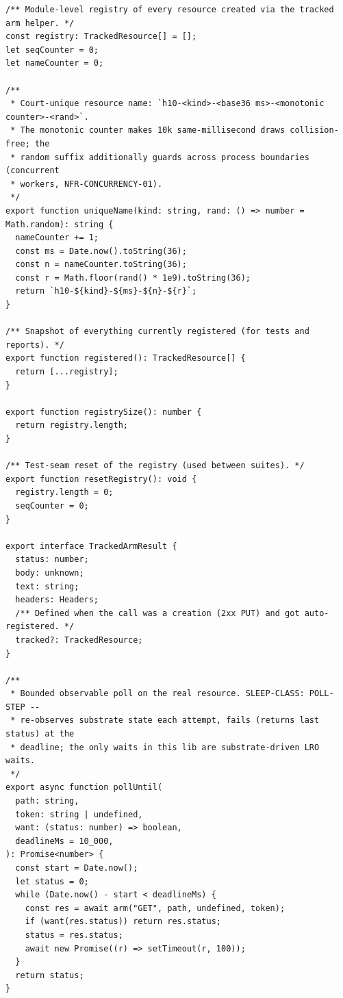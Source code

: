 \documentclass[10pt,twoside,openany]{book}
\theoremstyle{plain}
\theoremstyle{definition}
\theoremstyle{remark}
\begin{document}
\begin{lstlisting}[caption={apps/web/test/harness/lib/residue.ts}]
/** Module-level registry of every resource created via the tracked arm helper. */
const registry: TrackedResource[] = [];
let seqCounter = 0;
let nameCounter = 0;

/**
 * Court-unique resource name: `h10-<kind>-<base36 ms>-<monotonic counter>-<rand>`.
 * The monotonic counter makes 10k same-millisecond draws collision-free; the
 * random suffix additionally guards across process boundaries (concurrent
 * workers, NFR-CONCURRENCY-01).
 */
export function uniqueName(kind: string, rand: () => number = Math.random): string {
  nameCounter += 1;
  const ms = Date.now().toString(36);
  const n = nameCounter.toString(36);
  const r = Math.floor(rand() * 1e9).toString(36);
  return `h10-${kind}-${ms}-${n}-${r}`;
}

/** Snapshot of everything currently registered (for tests and reports). */
export function registered(): TrackedResource[] {
  return [...registry];
}

export function registrySize(): number {
  return registry.length;
}

/** Test-seam reset of the registry (used between suites). */
export function resetRegistry(): void {
  registry.length = 0;
  seqCounter = 0;
}

export interface TrackedArmResult {
  status: number;
  body: unknown;
  text: string;
  headers: Headers;
  /** Defined when the call was a creation (2xx PUT) and got auto-registered. */
  tracked?: TrackedResource;
}

/**
 * Bounded observable poll on the real resource. SLEEP-CLASS: POLL-STEP --
 * re-observes substrate state each attempt, fails (returns last status) at the
 * deadline; the only waits in this lib are substrate-driven LRO waits.
 */
export async function pollUntil(
  path: string,
  token: string | undefined,
  want: (status: number) => boolean,
  deadlineMs = 10_000,
): Promise<number> {
  const start = Date.now();
  let status = 0;
  while (Date.now() - start < deadlineMs) {
    const res = await arm("GET", path, undefined, token);
    if (want(res.status)) return res.status;
    status = res.status;
    await new Promise((r) => setTimeout(r, 100));
  }
  return status;
}


\end{lstlisting}
\end{document}
